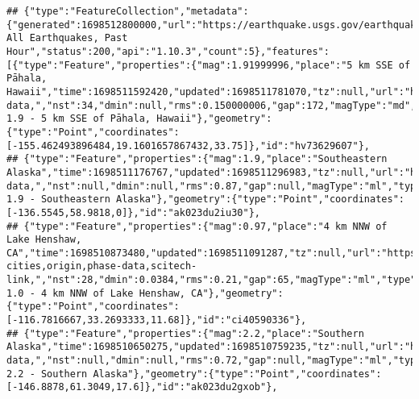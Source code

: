 \documentclass[
]{article}
\begin{document}
\begin{verbatim}
## {"type":"FeatureCollection","metadata":{"generated":1698512800000,"url":"https://earthquake.usgs.gov/earthquakes/feed/v1.0/summary/all_hour.geojson","title":"USGS All Earthquakes, Past Hour","status":200,"api":"1.10.3","count":5},"features":[{"type":"Feature","properties":{"mag":1.91999996,"place":"5 km SSE of Pāhala, Hawaii","time":1698511592420,"updated":1698511781070,"tz":null,"url":"https://earthquake.usgs.gov/earthquakes/eventpage/hv73629607","detail":"https://earthquake.usgs.gov/earthquakes/feed/v1.0/detail/hv73629607.geojson","felt":null,"cdi":null,"mmi":null,"alert":null,"status":"automatic","tsunami":0,"sig":57,"net":"hv","code":"73629607","ids":",hv73629607,","sources":",hv,","types":",origin,phase-data,","nst":34,"dmin":null,"rms":0.150000006,"gap":172,"magType":"md","type":"earthquake","title":"M 1.9 - 5 km SSE of Pāhala, Hawaii"},"geometry":{"type":"Point","coordinates":[-155.462493896484,19.1601657867432,33.75]},"id":"hv73629607"},
## {"type":"Feature","properties":{"mag":1.9,"place":"Southeastern Alaska","time":1698511176767,"updated":1698511296983,"tz":null,"url":"https://earthquake.usgs.gov/earthquakes/eventpage/ak023du2iu30","detail":"https://earthquake.usgs.gov/earthquakes/feed/v1.0/detail/ak023du2iu30.geojson","felt":null,"cdi":null,"mmi":null,"alert":null,"status":"automatic","tsunami":0,"sig":56,"net":"ak","code":"023du2iu30","ids":",ak023du2iu30,","sources":",ak,","types":",origin,phase-data,","nst":null,"dmin":null,"rms":0.87,"gap":null,"magType":"ml","type":"earthquake","title":"M 1.9 - Southeastern Alaska"},"geometry":{"type":"Point","coordinates":[-136.5545,58.9818,0]},"id":"ak023du2iu30"},
## {"type":"Feature","properties":{"mag":0.97,"place":"4 km NNW of Lake Henshaw, CA","time":1698510873480,"updated":1698511091287,"tz":null,"url":"https://earthquake.usgs.gov/earthquakes/eventpage/ci40590336","detail":"https://earthquake.usgs.gov/earthquakes/feed/v1.0/detail/ci40590336.geojson","felt":null,"cdi":null,"mmi":null,"alert":null,"status":"automatic","tsunami":0,"sig":14,"net":"ci","code":"40590336","ids":",ci40590336,","sources":",ci,","types":",nearby-cities,origin,phase-data,scitech-link,","nst":28,"dmin":0.0384,"rms":0.21,"gap":65,"magType":"ml","type":"earthquake","title":"M 1.0 - 4 km NNW of Lake Henshaw, CA"},"geometry":{"type":"Point","coordinates":[-116.7816667,33.2693333,11.68]},"id":"ci40590336"},
## {"type":"Feature","properties":{"mag":2.2,"place":"Southern Alaska","time":1698510650275,"updated":1698510759235,"tz":null,"url":"https://earthquake.usgs.gov/earthquakes/eventpage/ak023du2gxob","detail":"https://earthquake.usgs.gov/earthquakes/feed/v1.0/detail/ak023du2gxob.geojson","felt":null,"cdi":null,"mmi":null,"alert":null,"status":"automatic","tsunami":0,"sig":74,"net":"ak","code":"023du2gxob","ids":",ak023du2gxob,","sources":",ak,","types":",origin,phase-data,","nst":null,"dmin":null,"rms":0.72,"gap":null,"magType":"ml","type":"earthquake","title":"M 2.2 - Southern Alaska"},"geometry":{"type":"Point","coordinates":[-146.8878,61.3049,17.6]},"id":"ak023du2gxob"},

\end{verbatim}
\end{document}
